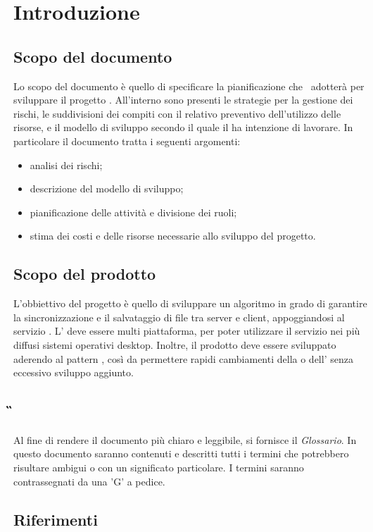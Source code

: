 \section{Introduzione}
\subsection{Scopo del documento}
Lo scopo del documento è quello di specificare la pianificazione che \Gruppo \, adotterà per sviluppare il progetto \NomeProgetto. All'interno sono presenti le strategie per la gestione dei rischi, le suddivisioni dei compiti con il relativo preventivo dell'utilizzo delle risorse, e il modello di sviluppo secondo il quale il  ha intenzione di lavorare.
In particolare il documento tratta i seguenti argomenti:
\begin{itemize}
\item analisi dei rischi;
\item descrizione del modello di sviluppo;
\item pianificazione delle attività e divisione dei ruoli;
\item stima dei costi e delle risorse necessarie allo sviluppo del progetto.
\end{itemize}
\subsection{Scopo del prodotto}
L'obbiettivo del progetto è quello di sviluppare un algoritmo in grado di garantire la sincronizzazione e il salvataggio di file tra server e client, appoggiandosi al servizio \textit{}.
L' deve essere multi piattaforma, per poter utilizzare il servizio nei più diffusi sistemi operativi desktop.
Inoltre, il prodotto deve essere sviluppato aderendo al pattern , così da permettere rapidi cambiamenti della  o dell' senza eccessivo sviluppo aggiunto.
\subsection{\G{}}
Al fine di rendere il documento più chiaro e leggibile, si fornisce il \textit{Glossario}. In questo documento saranno contenuti e descritti tutti i termini che potrebbero risultare ambigui o con un significato particolare. I termini saranno contrassegnati da una 'G' a pedice.
\subsection{Riferimenti}
